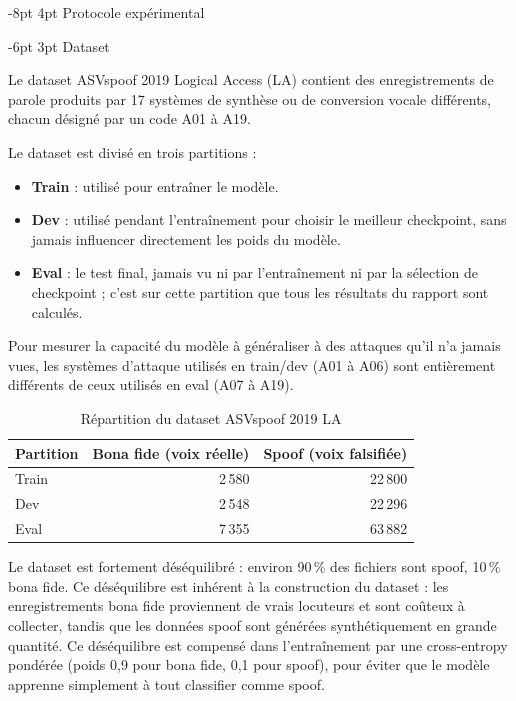 \documentclass[10pt, a4paper]{article}
\makeatletter
\renewcommand{\section}{\@startsection{section}{1}{\z@}%
  {-8pt \@plus -2pt \@minus -2pt}{4pt \@plus 1pt}%
  {\normalfont\Large\bfseries}}
\renewcommand{\subsection}{\@startsection{subsection}{2}{\z@}%
  {-6pt \@plus -2pt \@minus -1pt}{3pt \@plus 1pt}%
  {\normalfont\large\bfseries}}
\makeatother
\begin{document}
\section{Protocole expérimental}

\subsection{Dataset}

Le dataset ASVspoof 2019 Logical Access (LA) contient des enregistrements de parole produits par 17 systèmes de synthèse ou de conversion vocale différents, chacun désigné par un code A01 à A19.

Le dataset est divisé en trois partitions :
\begin{itemize}
  \item \textbf{Train} : utilisé pour entraîner le modèle.
  \item \textbf{Dev} : utilisé pendant l'entraînement pour choisir le meilleur checkpoint, sans jamais influencer directement les poids du modèle.
  \item \textbf{Eval} : le test final, jamais vu ni par l'entraînement ni par la sélection de checkpoint ; c'est sur cette partition que tous les résultats du rapport sont calculés.
\end{itemize}

Pour mesurer la capacité du modèle à généraliser à des attaques qu'il n'a jamais vues, les systèmes d'attaque utilisés en train/dev (A01 à A06) sont entièrement différents de ceux utilisés en eval (A07 à A19).

\begin{table}[H]
\centering\small
\caption{Répartition du dataset ASVspoof 2019 LA}
\begin{tabular}{@{}lrr@{}}
\toprule
Partition & Bona fide (voix réelle) & Spoof (voix falsifiée) \\
\midrule
Train & 2\,580 & 22\,800 \\
Dev   & 2\,548 & 22\,296 \\
Eval  & 7\,355 & 63\,882 \\
\bottomrule
\end{tabular}
\end{table}

Le dataset est fortement déséquilibré : environ 90\,\% des fichiers sont spoof, 10\,\% bona fide. Ce déséquilibre est inhérent à la construction du dataset : les enregistrements bona fide proviennent de vrais locuteurs et sont coûteux à collecter, tandis que les données spoof sont générées synthétiquement en grande quantité. Ce déséquilibre est compensé dans l'entraînement par une cross-entropy pondérée (poids 0,9 pour bona fide, 0,1 pour spoof), pour éviter que le modèle apprenne simplement à tout classifier comme spoof.
\end{document}
